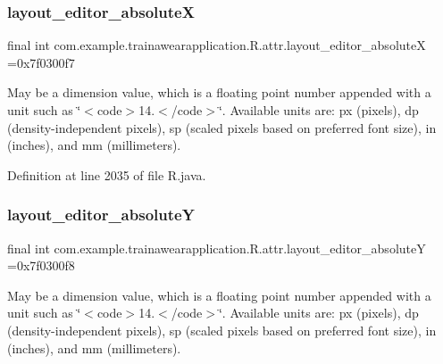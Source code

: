 \mbox{\label{classcom_1_1example_1_1trainawearapplication_1_1_r_1_1attr_ad35a5ce68e8bbb2c72dc9ebd44be7125}} 
\subsubsection{\texorpdfstring{layout\_editor\_absoluteX}{layout\_editor\_absoluteX}}
{\footnotesize\ttfamily final int com.\+example.\+trainawearapplication.\+R.\+attr.\+layout\+\_\+editor\+\_\+absoluteX =0x7f0300f7\hspace{0.3cm}{\ttfamily [static]}}

May be a dimension value, which is a floating point number appended with a unit such as \char`\"{}$<$code$>$14.\+5sp$<$/code$>$\char`\"{}. Available units are\+: px (pixels), dp (density-\/independent pixels), sp (scaled pixels based on preferred font size), in (inches), and mm (millimeters). 

Definition at line 2035 of file R.\+java.

\mbox{\label{classcom_1_1example_1_1trainawearapplication_1_1_r_1_1attr_ac6edf8148c894452ea2cf51a7470da4f}} 
\subsubsection{\texorpdfstring{layout\_editor\_absoluteY}{layout\_editor\_absoluteY}}
{\footnotesize\ttfamily final int com.\+example.\+trainawearapplication.\+R.\+attr.\+layout\+\_\+editor\+\_\+absoluteY =0x7f0300f8\hspace{0.3cm}{\ttfamily [static]}}

May be a dimension value, which is a floating point number appended with a unit such as \char`\"{}$<$code$>$14.\+5sp$<$/code$>$\char`\"{}. Available units are\+: px (pixels), dp (density-\/independent pixels), sp (scaled pixels based on preferred font size), in (inches), and mm (millimeters). 

